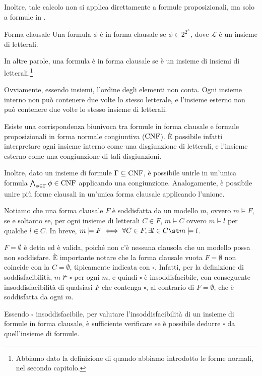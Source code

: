 Inoltre, tale calcolo non si applica direttamente a formule proposizionali, ma solo a formule in .

\begin{definition}{Forma clausale}
  Una formula \(\phi\) è in forma clausale se \(\phi \in 2^{2^\mathcal{L}}\), dove \(\mathcal{L}\) è un insieme di letterali.

  In altre parole, una formula è in forma clausale se è un insieme di insiemi di letterali.\footnote{Abbiamo dato la definizione di  quando abbiamo introdotto le forme normali, nel secondo capitolo.}
\end{definition}

Ovviamente, essendo insiemi, l'ordine degli elementi non conta. 
Ogni insieme interno non può contenere due volte lo stesso letterale, e l'insieme esterno non può contenere due volte lo stesso insieme di letterali.

Esiste una corrispondenza biunivoca tra formule in forma clausale e formule proposizionali in forma normale congiuntiva (\(\operatorname{CNF}\)). 
È possibile infatti interpretare ogni insieme interno come una disgiunzione di letterali, e l'insieme esterno come una congiunzione di tali disgiunzioni.

Inoltre, dato un insieme di formule \(\Gamma\subseteq\operatorname{CNF}\), è possibile unirle in un'unica formula \(\bigwedge_{\phi\in\Gamma}\phi \in \operatorname{CNF}\) applicando una congiunzione. Analogamente, è possibile unire più forme clausali in un'unica forma clausale applicando l'unione. 

Notiamo che una forma clausale \(F\) è soddisfatta da un modello \(m\), ovvero \(m\models F\), se e soltanto se, per ogni insieme di letterali \(C \in F\), \(m\models C\) ovvero \(m\models l\) per qualche \(l \in C\).
In breve, \(m\models F \iff \forall C \in F ,\exists l \in C\st m\models l\). 

\(F = \emptyset\) è detta  ed è valida, poiché non c'è nessuna clausola che un modello possa non soddisfare.
È importante notare che la forma clausale vuota \(F=\emptyset\) non coincide con la  \(C=\emptyset\), tipicamente indicata con \(\square\). 
Infatti, per la definizione di soddisfacibilità, \(m\not\models \square\) per ogni \(m\), e quindi \(\square\) è insoddisfacibile, con conseguente insoddisfacibilità di qualsiasi \(F\) che contenga \(\square\), al contrario di \(F=\emptyset\), che è soddisfatta da ogni \(m\).

Essendo \(\square\) insoddisfacibile, per valutare l'insoddisfacibilità di un insieme di formule in forma clausale, è sufficiente verificare se è possibile dedurre \(\square\) da quell'insieme di formule.

